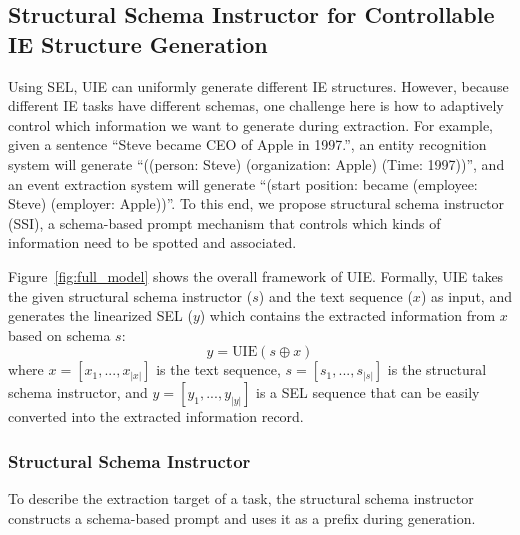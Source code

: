 \documentclass[11pt]{article}
\begin{document}
\subsection{Structural Schema Instructor for Controllable IE Structure Generation} \label{sec:schema_Instructor}
Using SEL, UIE can uniformly generate different IE structures.
However, because different IE tasks have different schemas, one challenge here is how to adaptively control which information we want to generate during extraction.
For example, given a sentence ``Steve became CEO of Apple in 1997.'', an entity recognition system will generate ``((person: Steve) (organization: Apple) (Time: 1997))'', and an event extraction system will generate ``(start position: became (employee: Steve) (employer: Apple))''.
To this end, we propose structural schema instructor (SSI), a schema-based prompt mechanism that controls which kinds of information need to be spotted and associated.

Figure~\ref{fig:full_model} shows the overall framework of UIE.
Formally, UIE takes the given structural schema instructor ($s$) and the text sequence ($x$) as input, and generates the linearized SEL ($y$) which contains the extracted information from $x$ based on schema $s$:
\begin{equation} \label{equ:uie}
    y = \text{UIE}(s \oplus x)
\end{equation}
where $x=[x_{1}, ..., x_{|x|}]$ is the text sequence, $s=[s_{1}, ..., s_{|s|}]$ is the structural schema instructor, and $y=[y_{1}, ..., y_{|y|}] $ is a SEL sequence that can be easily converted into the extracted information record.

\subsubsection{Structural Schema Instructor}
To describe the extraction target of a task, the structural schema instructor constructs a schema-based prompt and uses it as a prefix during generation.
\end{document}
